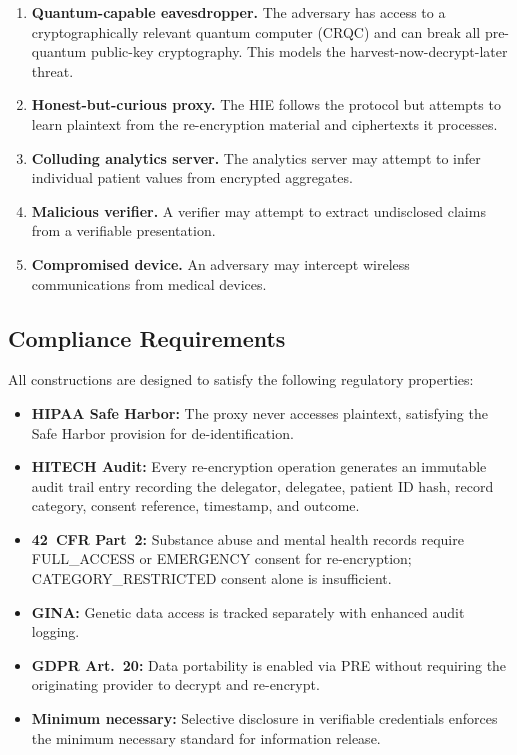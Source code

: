 \documentclass[conference,10pt]{IEEEtran}
\begin{document}
\begin{enumerate}[leftmargin=*]
    \item \textbf{Quantum-capable eavesdropper.} The adversary has access to a cryptographically relevant quantum computer (CRQC) and can break all pre-quantum public-key cryptography. This models the harvest-now-decrypt-later threat.

    \item \textbf{Honest-but-curious proxy.} The HIE follows the protocol but attempts to learn plaintext from the re-encryption material and ciphertexts it processes.

    \item \textbf{Colluding analytics server.} The analytics server may attempt to infer individual patient values from encrypted aggregates.

    \item \textbf{Malicious verifier.} A verifier may attempt to extract undisclosed claims from a verifiable presentation.

    \item \textbf{Compromised device.} An adversary may intercept wireless communications from medical devices.
\end{enumerate}

\subsection{Compliance Requirements}

All constructions are designed to satisfy the following regulatory properties:

\begin{itemize}[leftmargin=*]
    \item \textbf{HIPAA Safe Harbor:} The proxy never accesses plaintext, satisfying the Safe Harbor provision for de-identification.
    \item \textbf{HITECH Audit:} Every re-encryption operation generates an immutable audit trail entry recording the delegator, delegatee, patient ID hash, record category, consent reference, timestamp, and outcome.
    \item \textbf{42~CFR Part~2:} Substance abuse and mental health records require FULL\_ACCESS or EMERGENCY consent for re-encryption; CATEGORY\_RESTRICTED consent alone is insufficient.
    \item \textbf{GINA:} Genetic data access is tracked separately with enhanced audit logging.
    \item \textbf{GDPR Art.~20:} Data portability is enabled via PRE without requiring the originating provider to decrypt and re-encrypt.
    \item \textbf{Minimum necessary:} Selective disclosure in verifiable credentials enforces the minimum necessary standard for information release.
\end{itemize}
\end{document}
